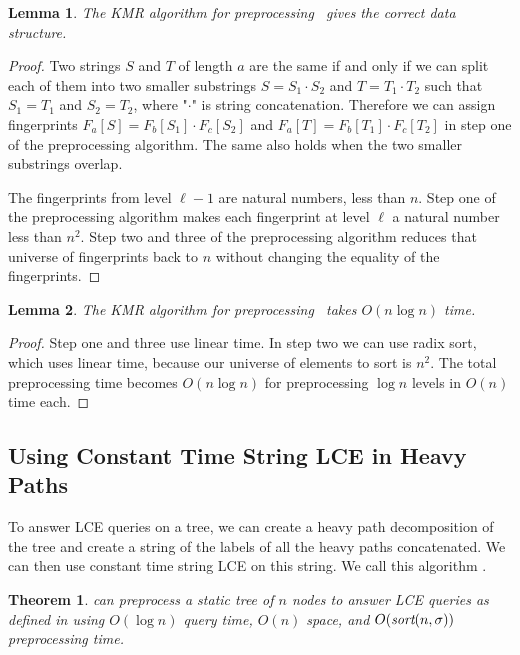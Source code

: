 \documentclass[a4]{article}
\newcommand*{\pref}{\prettyref}
\newtheorem{theorem}{Theorem}
\newtheorem{lemma}{Lemma}
\begin{document}
\begin{lemma}
The KMR algorithm for preprocessing \tfprintk\ gives the correct data structure.
\end{lemma}
\begin{proof}
Two strings $S$ and $T$ of length $a$ are the same if and only if we can split each of them into two smaller substrings $S = S_1\cdot S_2$ and $T=T_1\cdot T_2$ such that $S_1=T_1$ and $S_2=T_2$, where "$\cdot$" is string concatenation. Therefore we can assign fingerprints $F_a[S]=F_b[S_1]\cdot F_c[S_2]$ and $F_a[T]=F_b[T_1]\cdot F_c[T_2]$ in step one of the preprocessing algorithm. The same also holds when the two smaller substrings overlap.

The fingerprints from level $\ell-1$ are natural numbers, less than $n$. Step one of the preprocessing algorithm makes each fingerprint at level $\ell$ a natural number less than $n^2$. Step two and three of the preprocessing algorithm reduces that universe of fingerprints back to $n$ without changing the equality of the fingerprints.
\end{proof}

\begin{lemma}
The KMR algorithm for preprocessing \tfprintk\ takes $O(n\log n)$ time.
\end{lemma}
\begin{proof}
Step one and three use linear time. In step two we can use radix sort, which uses linear time, because our universe of elements to sort is $n^2$. The total preprocessing time becomes $O(n\log n)$ for preprocessing $\log n$ levels in $O(n)$ time each.
\end{proof}

\subsection{Using Constant Time String LCE in Heavy Paths}

To answer LCE queries on a tree, we can create a heavy path decomposition of the tree and create a string of the labels of all the heavy paths concatenated. We can then use constant time string LCE on this string. We call this algorithm .

\begin{theorem}
 can preprocess a static tree of $n$ nodes to answer LCE queries as defined in \pref{sec:tree-def} using $O(\log n)$ query time, $O(n)$ space, and $O(\textit{sort}(n,\sigma))$ preprocessing time.
\end{theorem}
\end{document}

